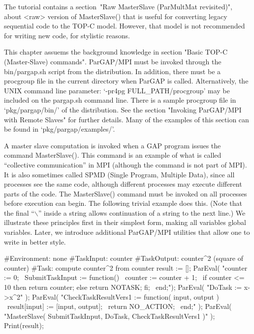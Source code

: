 
The tutorial contains a section~"Raw MasterSlave (ParMultMat
revisited)", about <raw> version of MasterSlave() that is useful for
converting legacy sequential code to the TOP-C model.  However, that
model is not recommended for writing new code, for stylistic reasons.



This chapter assuems the background knowledge in section
"Basic TOP-C (Master-Slave) commands".
ParGAP/MPI must be invoked through the bin/pargap.sh script from the
distribution.  In addition, there must be
a procgroup file in the current directory when ParGAP is called.
Alternatively, the UNIX command line parameter: 
`-pr4pg FULL_PATH/procgroup' may be included on the pargap.sh command
line.  There is a sample procgroup file in `pkg/pargap/bin/' of the
distribution.  See the section "Invoking ParGAP/MPI with Remote Slaves"
for further details.  Many of the examples of this section can be
found in `pkg/pargap/examples/'.


A master slave computation is invoked when a GAP program issues the
command MasterSlave().  This command is an example of what is called
``collective communication'' in MPI (although the command is not part of
MPI).  It is also sometimes called SPMD (Single Program, Multiple
Data), since all processes see the same code, although different
processes may execute different parts of the code.  The MasterSlave()
command must be invoked on all processes before execution can begin.
The following trivial example does this.  (Note that the final ``$\backslash$''
inside a string allows continuation of a string to the next line.)
We illustrate these principles first in their simplest form, making
all variables global variables.  Later, we introduce additional
ParGAP/MPI utilities that allow one to write in better style.

\beginexample
#Environment: none
#TaskInput:   counter
#TaskOutput:  counter^2 (square of counter)
#Task:        compute counter^2 from counter
result := [];
ParEval( "counter := 0; \
          SubmitTaskInput := function() \
            counter := counter + 1; \
            if counter <= 10 then return counter; else return NOTASK; fi; \
          end;");
ParEval( "DoTask := x->x^2" );
ParEval( "CheckTaskResultVers1 := function( input, output ) \
            result[input] := [input, output]; \
            return NO_ACTION; \
          end;" );
ParEval( "MasterSlave( SubmitTaskInput, DoTask, CheckTaskResultVers1 )" );
Print(result);
\endexample

